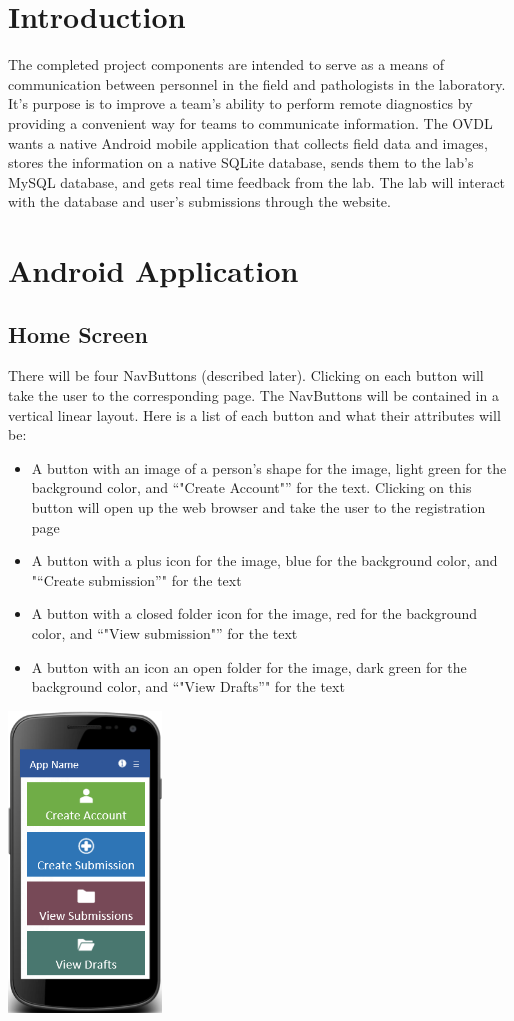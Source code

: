\documentclass[onecolumn, draftclsnofoot,10pt, compsoc]{IEEEtran}
\begin{document}
\section{Introduction}
The completed project components are intended to serve as a means of communication between personnel in the field and pathologists in the laboratory. It's purpose is to improve a team's ability to perform remote diagnostics by providing a convenient way for teams to communicate information. The OVDL wants a native Android mobile application that collects field data and images, stores the information on a native SQLite database, sends them to the lab's MySQL database, and gets real time feedback from the lab. The lab will interact with the database and user's submissions through the website. 

\section{Android Application}
\subsection{Home Screen}
There will be four NavButtons (described later). Clicking on each button will take the user to the corresponding page. The NavButtons will be contained in a vertical linear layout. Here is a list of each button and what their attributes will be:
\begin{itemize}
\item A button with an image of a person’s shape for the image, light green for the background color, and “"Create Account"” for the text. Clicking on this button will open up the web browser and take the user to the registration page
\item A button with a plus icon for the image, blue for the background color, and "“Create submission”" for the text
\item A button with a closed folder icon for the image, red for the background color, and “"View submission"” for the text
\item A button with an icon an open folder for the image, dark green for the background color, and “"View Drafts”" for the text
\end{itemize}

\begin{center}
\includegraphics[height=8cm]{homescreen.png}
\end{center}
\end{document}
